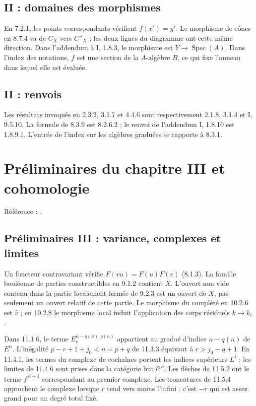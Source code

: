 \documentclass[11pt,a4paper]{article}
\begin{document}
\subsection{II : domaines des morphismes}
\label{note:base2-domains}
En 7.2.1, les points correspondants vérifient $f(x')=y'$.
Le morphisme de cônes en 8.7.4 va de $C_X$ vers $C''_X$ ;
les deux lignes du diagramme ont cette même direction.
Dans l'addendum à I, 1.8.3, le morphisme est
$Y\to\operatorname{Spec}(A)$. Dans l'index des notations,
$f$ est une section de la $A$-algèbre $B$, ce qui fixe
l'anneau dans lequel elle est évaluée.

\subsection{II : renvois}
\label{note:base2-refs}
Les résultats invoqués en 2.3.2, 3.1.7 et 4.4.6 sont
respectivement 2.1.8, 3.1.4 et I, 9.5.10.
La formule de 8.3.9 est 8.2.6.2 ; le renvoi de l'addendum
I, 1.8.10 est 1.8.9.1. L'entrée de l'index sur les algèbres
graduées se rapporte à 8.3.1.
\par

\section{Préliminaires du chapitre III et cohomologie}
\label{part:base3}
Référence : \cite{EGAIII1}.
\subsection{Préliminaires III : variance, complexes et limites}
\label{note:base3-complexes}
Un foncteur contravariant vérifie $F(vu)=F(u)F(v)$ (8.1.3).
La famille booléenne de parties constructibles en 9.1.2 contient
$X$. L'ouvert non vide contenu dans la partie localement fermée
de 9.2.3 est un ouvert de $X$, pas seulement un ouvert relatif
de cette partie. Le morphisme du complété en 10.2.6 est
$\widehat v$ ; en 10.2.8 le morphisme local induit l'application
des corps résiduels $k\to k_i$.

Dans 11.1.6, le terme $E_r^{n-q(n),q(n)}$ appartient au gradué
d'indice $n-q(n)$ de $E^n$. L'inégalité
$p-r+1+j_0<n=p+q$ de 11.3.3 équivaut à $r>j_0-q+1$.
En 11.4.1, les termes du complexe de cochaînes portent les
indices supérieurs $L^i$ ; les limites de 11.4.6 sont prises
dans la catégorie but $\mathcal C''$.
Les flèches de 11.5.2 ont le terme $f'^{i+1}$ correspondant
au premier complexe. Les troncatures de 11.5.4 approchent le
complexe lorsque $r$ tend vers moins l'infini : c'est
$-r$ qui est assez grand pour un degré total fixé.
\end{document}
